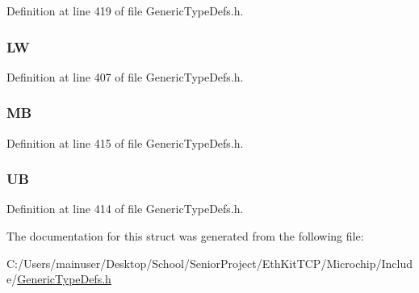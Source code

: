 Definition at line 419 of file Generic\+Type\+Defs.\+h.

\hypertarget{struct_d_w_o_r_d___v_a_l_1_1_____p_a_c_k_e_d_a19457eba8e3d1d0a4882a78dd1c18fa1}{}
\subsubsection[{L\+W}]{ L\+W}\label{struct_d_w_o_r_d___v_a_l_1_1_____p_a_c_k_e_d_a19457eba8e3d1d0a4882a78dd1c18fa1}


Definition at line 407 of file Generic\+Type\+Defs.\+h.

\hypertarget{struct_d_w_o_r_d___v_a_l_1_1_____p_a_c_k_e_d_a3b00ed72568d5ae2b0a4e9ab0c69b659}{}
\subsubsection[{M\+B}]{ M\+B}\label{struct_d_w_o_r_d___v_a_l_1_1_____p_a_c_k_e_d_a3b00ed72568d5ae2b0a4e9ab0c69b659}


Definition at line 415 of file Generic\+Type\+Defs.\+h.

\hypertarget{struct_d_w_o_r_d___v_a_l_1_1_____p_a_c_k_e_d_af2f0dd009fbf87e2719787a2b6b4334f}{}
\subsubsection[{U\+B}]{ U\+B}\label{struct_d_w_o_r_d___v_a_l_1_1_____p_a_c_k_e_d_af2f0dd009fbf87e2719787a2b6b4334f}


Definition at line 414 of file Generic\+Type\+Defs.\+h.



The documentation for this struct was generated from the following file\+:\begin{DoxyCompactItemize}
\item 
C\+:/\+Users/mainuser/\+Desktop/\+School/\+Senior\+Project/\+Eth\+Kit\+T\+C\+P/\+Microchip/\+Include/\hyperlink{_generic_type_defs_8h}{Generic\+Type\+Defs.\+h}\end{DoxyCompactItemize}
